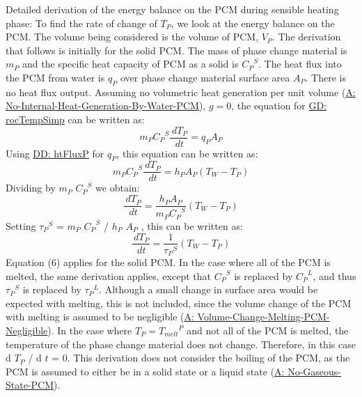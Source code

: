 \documentclass[12pt]{article}
\begin{document}
Detailed derivation of the energy balance on the PCM during  sensible heating phase:
To find the rate of change of ${T_{P}}$, we look at the energy balance on the PCM. The volume being considered is the volume of PCM, ${V_{P}}$. The derivation that follows is initially for the solid PCM. The mass of phase change material is ${m_{P}}$ and the specific heat capacity of PCM as a solid is ${{C_{P}}^{S}}$. The heat flux into the PCM from water is ${q_{P}}$ over phase change material surface area ${A_{P}}$. There is no heat flux output. Assuming no volumetric heat generation per unit volume (\hyperref[assumpNIHGBWP]{A: No-Internal-Heat-Generation-By-Water-PCM}), $g=0$, the equation for \hyperref[GD:rocTempSimp]{GD: rocTempSimp} can be written as:
\begin{displaymath}
{m_{P}} {{C_{P}}^{S}} \frac{\,d{T_{P}}}{\,dt}={q_{P}} {A_{P}}
\end{displaymath}
Using \hyperref[DD:htFluxP]{DD: htFluxP} for ${q_{P}}$, this equation can be written as:
\begin{displaymath}
{m_{P}} {{C_{P}}^{S}} \frac{\,d{T_{P}}}{\,dt}={h_{P}} {A_{P}} \left({T_{W}}-{T_{P}}\right)
\end{displaymath}
Dividing by ${m_{P}}$ ${{C_{P}}^{S}}$ we obtain:
\begin{displaymath}
\frac{\,d{T_{P}}}{\,dt}=\frac{{h_{P}} {A_{P}}}{{m_{P}} {{C_{P}}^{S}}} \left({T_{W}}-{T_{P}}\right)
\end{displaymath}
Setting ${{τ_{P}}^{S}}$ = ${m_{P}}$ ${{C_{P}}^{S}}$ / ${h_{P}}$ ${A_{P}}$ , this can be written as:
\begin{displaymath}
\frac{\,d{T_{P}}}{\,dt}=\frac{1}{{{τ_{P}}^{S}}} \left({T_{W}}-{T_{P}}\right)
\end{displaymath}
Equation (6) applies for the solid PCM. In the case where all of the PCM is melted, the same derivation applies, except that ${{C_{P}}^{S}}$ is replaced by ${{C_{P}}^{L}}$, and thus ${{τ_{P}}^{S}}$ is replaced by ${{τ_{P}}^{L}}$. Although a small change in surface area would be expected with melting, this is not included, since the volume change of the PCM with melting is assumed to be negligible (\hyperref[assumpVCMPN]{A: Volume-Change-Melting-PCM-Negligible}).
In the case where ${T_{P}}={{T_{melt}}^{P}}$ and not all of the PCM is melted, the temperature of the phase change material does not change. Therefore, in this case d ${T_{P}}$ / d $t$ = 0.
This derivation does not consider the boiling of the PCM, as the PCM is assumed to either be in a solid state or a liquid state (\hyperref[assumpNGSP]{A: No-Gaseous-State-PCM}).
\par~
\end{document}
